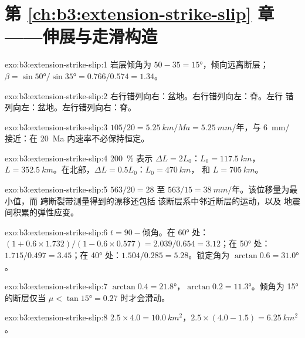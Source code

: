 \section*{第 \ref{ch:b3:extension-strike-slip} 章——伸展与走滑构造}

\begin{solution}{exo:b3:extension-strike-slip:1}
岩层倾角为 $50 - 35 = \ang{15}$，倾向远离断层；$\beta =
\sin\ang{50}/\sin\ang{35} = 0.766/0.574 = 1.34$。
\end{solution}

\begin{solution}{exo:b3:extension-strike-slip:2}
右行错列向右：盆地。右行错列向左：脊。左行
错列向左：盆地。左行错列向右：脊。
\end{solution}

\begin{solution}{exo:b3:extension-strike-slip:3}
$105/20 = \qty{5.25}{km/Ma} = \qty{5.25}{mm/\text{年}}$，与
\qty{6}{mm/} 接近：在 \qty{20}{Ma} 内速率不必保持恒定。
\end{solution}

\begin{solution}{exo:b3:extension-strike-slip:4}
\qty{200}{\percent} 表示 $\Delta L = 2L_0$：$L_0 = \qty{117.5}{km}$，$L
= \qty{352.5}{km}$。在北部，$\Delta L = 0.5L_0$：$L_0 = \qty{470}{km}$，
和 $L = \qty{705}{km}$。
\end{solution}

\begin{solution}{exo:b3:extension-strike-slip:5}
$563/20 = 28$ 至 $563/15 = \qty{38}{mm/\text{年}}$。该位移量为最小值，而
跨断裂带测量得到的漂移还包括
该断层系中邻近断层的运动，以及
地震间积累的弹性应变。
\end{solution}

\begin{solution}{exo:b3:extension-strike-slip:6}
$t = 90 - \text{倾角}$。在 \ang{60} 处：$(1 + 0.6\times1.732)/(1 - 0.6\times
0.577) = 2.039/0.654 = 3.12$；在 \ang{50} 处：$1.715/0.497 = 3.45$；在
\ang{40} 处：$1.504/0.285 = 5.28$。锁定角为 $\arctan0.6 = \ang{31.0}$。
\end{solution}

\begin{solution}{exo:b3:extension-strike-slip:7}
$\arctan0.4 = \ang{21.8}$，$\arctan0.2 = \ang{11.3}$。倾角为
\ang{15} 的断层仅当 $\mu < \tan\ang{15} = 0.27$ 时才会滑动。
\end{solution}

\begin{solution}{exo:b3:extension-strike-slip:8}
$2.5\times4.0 = \qty{10.0}{km^2}$，$2.5\times(4.0 - 1.5) =
\qty{6.25}{km^2}$。
\end{solution}

